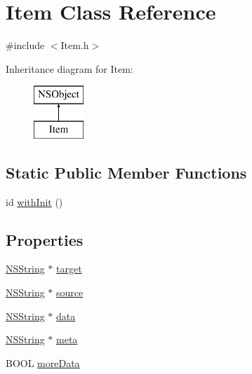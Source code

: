 \hypertarget{interface_item}{
\section{\-Item \-Class \-Reference}
\label{interface_item}
}


{\ttfamily \#include $<$\-Item.\-h$>$}

\-Inheritance diagram for \-Item\-:\begin{figure}[H]
\begin{center}
\leavevmode
\includegraphics[height=2.000000cm]{interface_item}
\end{center}
\end{figure}
\subsection*{\-Static \-Public \-Member \-Functions}
\begin{DoxyCompactItemize}
\item 
id \hyperlink{interface_item_a9d87d1ebf041760e63fae33310428714}{with\-Init} ()
\end{DoxyCompactItemize}
\subsection*{\-Properties}
\begin{DoxyCompactItemize}
\item 
\hyperlink{class_n_s_string}{\-N\-S\-String} $\ast$ \hyperlink{interface_item_aa9822b98fc5ea5d34f926e82be1f5caf}{target}
\item 
\hyperlink{class_n_s_string}{\-N\-S\-String} $\ast$ \hyperlink{interface_item_a157430cb4306f46b8185fd247db6f83c}{source}
\item 
\hyperlink{class_n_s_string}{\-N\-S\-String} $\ast$ \hyperlink{interface_item_ae70e2d789c562082e1f52a5464d7aecc}{data}
\item 
\hyperlink{class_n_s_string}{\-N\-S\-String} $\ast$ \hyperlink{interface_item_a1b3bbe19a2503bd65797941738720e68}{meta}
\item 
\-B\-O\-O\-L \hyperlink{interface_item_ac2b17888a9e55c94063e9f47cc5d00cb}{more\-Data}
\end{DoxyCompactItemize}


